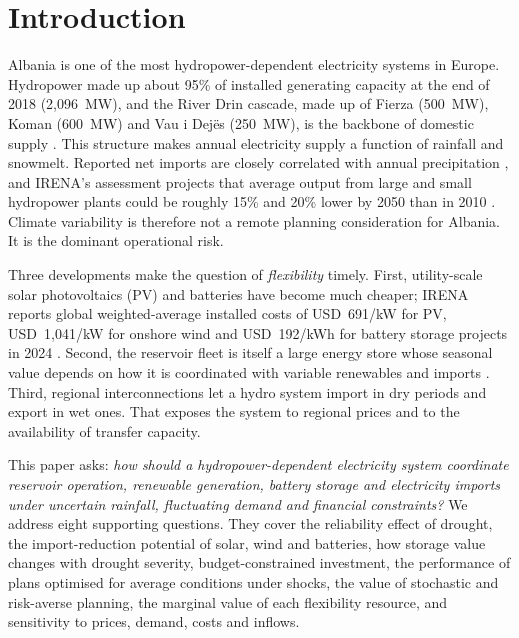 \section{Introduction}
\label{sec:intro}

Albania is one of the most hydropower-dependent electricity systems in Europe. Hydropower made up about
95\% of installed generating capacity at the end of 2018 (2{,}096~MW), and the River Drin cascade, made up of
Fierza (500~MW), Koman (600~MW) and Vau i Dejës (250~MW), is the backbone of domestic supply
\cite{irena2021rra,kesh2026drin}. This structure makes annual electricity supply a function of rainfall and
snowmelt. Reported net imports are closely correlated with annual precipitation \cite{irena2021rra}, and
IRENA's assessment projects that average output from large and small hydropower plants could be roughly 15\% and
20\% lower by 2050 than in 2010 \cite{irena2021rra}. Climate variability is therefore not a remote planning
consideration for Albania. It is the dominant operational risk.

Three developments make the question of \emph{flexibility} timely. First, utility-scale solar photovoltaics
(PV) and batteries have become much cheaper; IRENA reports global weighted-average installed costs of
USD~691/kW for PV, USD~1{,}041/kW for onshore wind and USD~192/kWh for battery storage projects in 2024
\cite{irena2025costs}. Second, the reservoir fleet is itself a large energy store whose seasonal value
depends on how it is coordinated with variable renewables and imports \cite{labadie2004reservoir}. Third,
regional interconnections let a hydro system import in dry periods and export in wet ones. That exposes
the system to regional prices and to the availability of transfer capacity.

This paper asks: \emph{how should a hydropower-dependent electricity system coordinate reservoir operation,
renewable generation, battery storage and electricity imports under uncertain rainfall, fluctuating demand
and financial constraints?} We address eight supporting questions. They cover the reliability effect of
drought, the import-reduction potential of solar, wind and batteries, how storage value changes with drought
severity, budget-constrained investment, the performance of plans optimised for average conditions under
shocks, the value of stochastic and risk-averse planning, the marginal value of each flexibility resource, and
sensitivity to prices, demand, costs and inflows.

